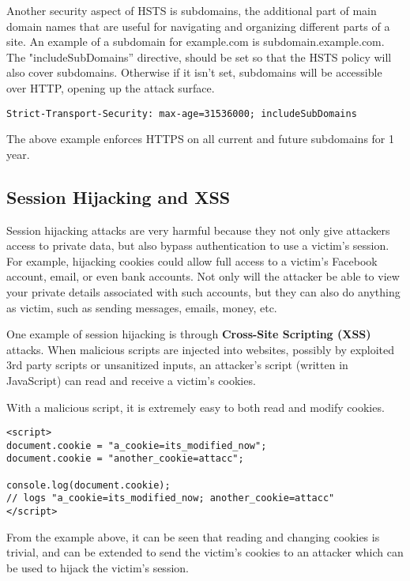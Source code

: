 \documentclass[conference,12pt]{IEEEtran}
\begin{document}
Another security aspect of HSTS is subdomains, the additional part of main
domain names that are useful for navigating and organizing different parts of a
site.  An example of a subdomain for example.com is subdomain.example.com.  The
"includeSubDomains” directive, should be set so that the HSTS policy will also
cover subdomains.  Otherwise if it isn’t set, subdomains will be accessible over
HTTP, opening up the attack surface.

\begin{lstlisting}[caption={Example of the HTTP Strict-Transport-Security response header}]
Strict-Transport-Security: max-age=31536000; includeSubDomains
\end{lstlisting}

The above example enforces HTTPS on all current and future subdomains for 1 year.

\subsection{Session Hijacking and XSS}

Session hijacking attacks are very harmful because they not only give attackers
access to private data, but also bypass authentication to use a victim’s
session.  For example, hijacking cookies could allow full access to a victim’s
Facebook account, email, or even bank accounts. Not only will the attacker be
able to view your private details associated with such accounts, but they can
also do anything as victim, such as sending messages, emails, money, etc.

One example of session hijacking is through \textbf{Cross-Site Scripting (XSS)}
attacks. When malicious scripts are injected into websites, possibly by
exploited 3rd party scripts or unsanitized inputs, an attacker’s script (written
in JavaScript) can read and receive a victim’s cookies.

With a malicious script, it is extremely easy to both read and modify cookies.

\begin{lstlisting}[caption={Example of reading and modifying cookies}]
<script>
document.cookie = "a_cookie=its_modified_now"; 
document.cookie = "another_cookie=attacc"; 

console.log(document.cookie); 
// logs "a_cookie=its_modified_now; another_cookie=attacc"
</script>
\end{lstlisting}

From the example above, it can be seen that reading and changing cookies is
trivial, and can be extended to send the victim’s cookies to an attacker which
can be used to hijack the victim's session.
\end{document}
